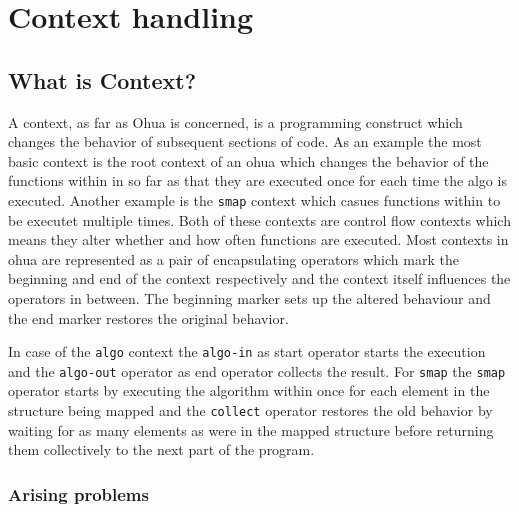 \chapter{Context handling}

\label{ChapterContext}

\section{What is Context?}

A context, as far as Ohua is concerned, is a programming construct which changes the behavior of subsequent sections of code.
As an example the most basic context is the root context of an ohua  which changes the behavior of the functions within in so far as that they are executed once for each time the algo is executed.
Another example is the \texttt{smap} context which casues functions within to be executet multiple times.
Both of these contexts are control flow contexts which means they alter whether and how often functions are executed.
Most contexts in ohua are represented as a pair of encapsulating operators which mark the beginning and end of the context respectively and the context itself influences the operators in between.
The beginning marker sets up the altered behaviour and the end marker restores the original behavior.

In case of the \texttt{algo} context the \texttt{algo-in} as start operator starts the execution and the \texttt{algo-out} operator as end operator collects the result.
For \texttt{smap} the \texttt{smap} operator starts by executing the algorithm within once for each element in the structure being mapped and the \texttt{collect} operator restores the old behavior by waiting for as many elements as were in the mapped structure before returning them collectively to the next part of the program.

\subsection{Arising problems}


